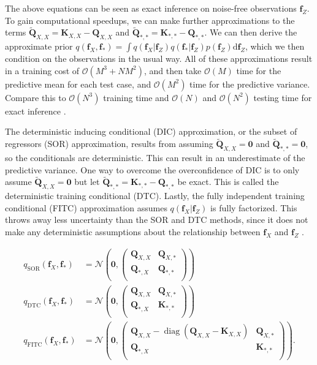 \documentclass[../../../main.tex]{subfiles}
\begin{document}
The above equations can be seen as exact inference on noise-free observations $\bm{f}_Z$. To gain computational speedups, we can make further approximations to the terms $\tilde{\bm{Q}}_{X,X}=\bm{K}_{X,X}-\bm{Q}_{X,X}$ and $\tilde{\bm{Q}}_{\ast,\ast}=\bm{K}_{\ast,\ast}-\bm{Q}_{\ast,\ast}$. We can then derive the approximate prior $q(\bm{f}_X,\bm{f}_\ast)=\int q(\bm{f}_X|\bm{f}_Z)q(\bm{f}_\ast|\bm{f}_Z)p(\bm{f}_Z)\mathrm{d}\bm{f}_Z$, which we then condition on the observations in the usual way. All of these approximations result in a training cost of $\mathcal{O}(M^3+NM^2)$, and then take $\mathcal{O}(M)$ time for the predictive mean for each test case, and $\mathcal{O}(M^2)$ time for the predictive variance. Compare this to $\mathcal{O}(N^3)$ training time and $\mathcal{O}(N)$ and $\mathcal{O}(N^2)$ testing time for exact inference \autocite{Murphy2023}.

The deterministic inducing conditional (DIC) approximation, or the subset of regressors (SOR) approximation, results from assuming $\tilde{\bm{Q}}_{X,X}=\bm{0}$ and $\tilde{\bm{Q}}_{\ast,\ast}=\bm{0}$, so the conditionals are deterministic. This can result in an underestimate of the predictive variance. One way to overcome the overconfidence of DIC is to only assume $\tilde{\bm{Q}}_{X,X}=\bm{0}$ but let $\tilde{\bm{Q}}_{\ast,\ast}=\bm{K}_{\ast,\ast}-\bm{Q}_{\ast,\ast}$ be exact. This is called the deterministic training conditional (DTC). Lastly, the fully independent training conditional (FITC) approximation assumes $q(\bm{f}_X|\bm{f}_Z)$ is fully factorized. This throws away less uncertainty than the SOR and DTC methods, since it does not make any deterministic assumptions about the relationship between $\bm{f}_X$ and $\bm{f}_Z$ \autocite{Murphy2023}.

\begin{align}
q_{\mathrm{SOR}}(\bm{f}_X,\bm{f}_\ast) &= \mathcal{N}\left(\bm{0},
\begin{pmatrix}
\bm{Q}_{X,X} & \bm{Q}_{X,\ast} \\
\bm{Q}_{\ast,X} & \bm{Q}_{\ast,\ast} \\
\end{pmatrix}
\right) \\
q_{\mathrm{DTC}}(\bm{f}_X,\bm{f}_\ast) &=
\mathcal{N}\left(\bm{0},
\begin{pmatrix}
\bm{Q}_{X,X} & \bm{Q}_{X,\ast} \\
\bm{Q}_{\ast,X} & \bm{K}_{\ast,\ast} \\
\end{pmatrix}
\right) \\
q_{\mathrm{FITC}}(\bm{f}_X,\bm{f}_\ast) &=
\mathcal{N}\left(\bm{0},
\begin{pmatrix}
\bm{Q}_{X,X}-\operatorname{diag}(\bm{Q}_{X,X}-\bm{K}_{X,X}) & \bm{Q}_{X,\ast} \\
\bm{Q}_{\ast,X} & \bm{K}_{\ast,\ast} \\
\end{pmatrix}
\right).
\end{align}
\end{document}
